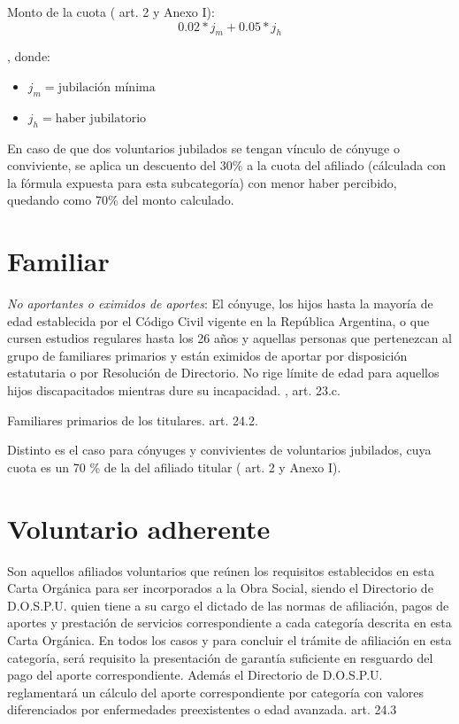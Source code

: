 Monto de la cuota (\cite{dospuRes21} art. 2 y Anexo I): $$0.02 * j_m + 0.05 * j_h$$

, donde:
\begin{itemize}
    \item $j_m = \text{jubilación mínima}$
    \item $j_h = \text{haber jubilatorio}$
\end{itemize}

En caso de que dos voluntarios jubilados se tengan vínculo de cónyuge o conviviente, se aplica un descuento del 30\% a la cuota del afiliado (cálculada con la fórmula expuesta para esta subcategoría) con menor haber percibido, quedando como 70\% del monto calculado.

\section{Familiar} \label{sec:familiar}
\begin{displayquote}
\emph{No aportantes o eximidos de aportes}: El cónyuge, los hijos hasta la mayoría de edad establecida por el Código Civil vigente en la República Argentina, o que cursen estudios regulares hasta los 26 años y aquellas personas que pertenezcan al grupo de familiares primarios y están eximidos de aportar por disposición estatutaria o por Resolución de Directorio. No rige límite de edad para aquellos hijos discapacitados mientras dure su incapacidad.
\hfill\parencite{CSOrd53}, art. 23.c.
\end{displayquote}

\begin{displayquote}
Familiares primarios de los titulares.
\hfill\parencite{CSOrd53} art. 24.2.
\end{displayquote}

Distinto es el caso para cónyuges y convivientes de voluntarios jubilados, cuya cuota es un 70 \% de la del afiliado titular (\cite{dospuRes21} art. 2 y Anexo I).

\section{Voluntario adherente} \label{sec:adherente}
\begin{displayquote}
Son aquellos afiliados voluntarios que reúnen los requisitos establecidos en esta Carta Orgánica para ser incorporados a la Obra Social, siendo el Directorio de D.O.S.P.U. quien tiene a su cargo el dictado de las normas de afiliación, pagos de aportes y prestación de servicios correspondiente a cada categoría descrita en esta Carta Orgánica. En todos los casos y para concluir el trámite de afiliación en esta categoría, será requisito la presentación de garantía suficiente en resguardo del pago del aporte correspondiente. Además el Directorio de D.O.S.P.U. reglamentará un cálculo del aporte correspondiente por categoría con valores diferenciados por enfermedades preexistentes o edad avanzada.
\hfill\parencite{CSOrd53} art. 24.3
\end{displayquote}

